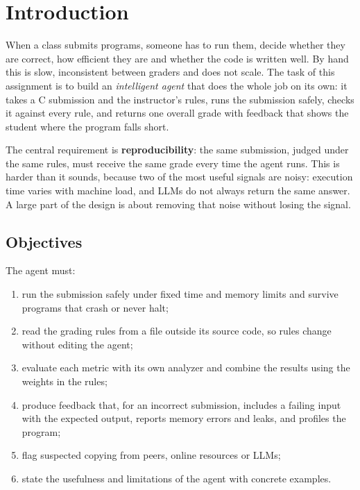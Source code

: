 \documentclass[11pt,a4paper]{article}
\begin{document}
\section{Introduction}
When a class submits programs, someone has to run them, decide whether they are correct, how efficient they are and
whether the code is written well. By hand this is slow, inconsistent between graders and does not scale. The task of
this assignment is to build an \emph{intelligent agent} that does the whole job on its own: it takes a C submission and
the instructor's rules, runs the submission safely, checks it against every rule, and returns one overall grade with
feedback that shows the student where the program falls short.

The central requirement is \textbf{reproducibility}: the same submission, judged under the same rules, must receive the
same grade every time the agent runs. This is harder than it sounds, because two of the most useful signals are noisy:
execution time varies with machine load, and LLMs do not always return the same answer. A large part of the design is
about removing that noise without losing the signal.

\subsection{Objectives}
The agent must:
\begin{enumerate}
  \item run the submission safely under fixed time and memory limits and survive programs that crash or never halt;
  \item read the grading rules from a file outside its source code, so rules change without editing the agent;
  \item evaluate each metric with its own analyzer and combine the results using the weights in the rules;
  \item produce feedback that, for an incorrect submission, includes a failing input with the expected output, reports
        memory errors and leaks, and profiles the program;
  \item flag suspected copying from peers, online resources or LLMs;
  \item state the usefulness and limitations of the agent with concrete examples.
\end{enumerate}
\end{document}
